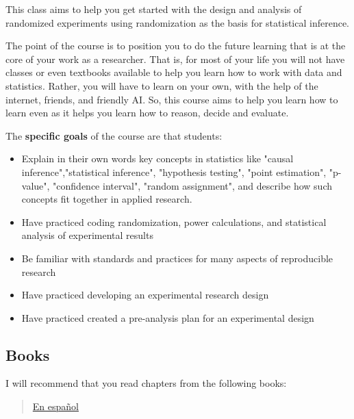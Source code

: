 \documentclass[10pt]{article}
\newenvironment{introstuff} {\setcounter{secnumdepth}{0}} {\setcounter{secnumdepth}{1}}
\begin{document}
\begin{introstuff}
This class aims to help you get started with the design and analysis of
randomized experiments using randomization as the basis for statistical
inference.

The point of the course is to position you to do the future learning
that is at the core of your work as a researcher. That is,
for most of your life you will not have classes or even textbooks
available to help you learn how to work with data and statistics.
Rather, you will have to learn on your own, with the help of the
internet, friends, and friendly AI. So, this course aims to help you
learn how to learn even as it helps you learn how to reason, decide and
evaluate.

The \textbf{specific goals} of the course are that students:

\begin{itemize}[noitemsep]

    \item Explain in their own words key concepts in statistics like "causal
        inference","statistical inference", "hypothesis testing", "point
        estimation", "p-value", "confidence interval", "random assignment", and
        describe how such concepts fit together in applied research.
    \item Have practiced coding randomization, power calculations, and statistical analysis
        of experimental results
    \item Be familiar with standards and practices for many aspects of reproducible research
    \item Have practiced developing an experimental research design
    \item Have practiced created a pre-analysis plan for an experimental design

\end{itemize}


\subsection{Books}

I will recommend that you read chapters from the following books:

\begin{verse}

  \href{https://egap.github.io/theory_and_practice_of_field_experiments_spanish/}{En español}

\end{verse}


\end{introstuff}
\end{document}
